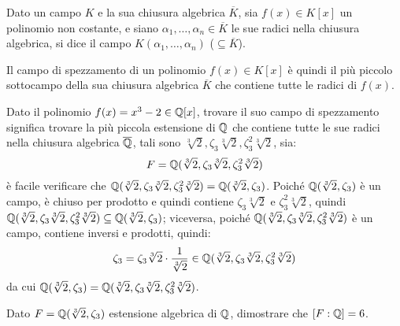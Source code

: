 \documentclass[11pt]{scrartcl}
\begin{document}
\begin{definition}
Dato un campo $K$ e la sua chiusura algebrica $\overline K$, sia $f(x) \in K[x]$ un polinomio non costante, e siano $\alpha_1,\ldots,\alpha_n \in \overline K$ le sue radici nella chiusura algebrica, si dice  il campo $K(\alpha_1,\ldots,\alpha_n)$ ($\subseteq \overline K$). 
\end{definition}

\begin{remark}
Il campo di spezzamento di un polinomio $f(x) \in K[x]$ è quindi il più piccolo sottocampo della sua chiusura algebrica $\overline K$ che contiene tutte le radici di $f(x)$. 
\end{remark}

\begin{example}
Dato il polinomio $f(x) = x^3 - 2 \in \mathbb Q[x]$, trovare il suo campo di spezzamento significa trovare la più piccola estensione di $\mathbb Q$ che contiene tutte le sue radici nella chiusura algebrica $\overline{\mathbb Q}$, tali sono $\sqrt[3]2, \zeta_3\sqrt[3]2, \zeta_3^2\sqrt[3]2$, sia:
	\[ F=\mathbb Q(\sqrt[3]2, \zeta_3\sqrt[3]2, \zeta_3^2\sqrt[3]2)
	\]
è facile verificare che $\mathbb Q(\sqrt[3]2, \zeta_3\sqrt[3]2, \zeta_3^2\sqrt[3]2) = \mathbb Q(\sqrt[3]2, \zeta_3)$. Poiché $\mathbb Q(\sqrt[3]2, \zeta_3)$ è un campo, è chiuso per prodotto e quindi contiene $\zeta_3\sqrt[3]2$ e $\zeta_3^2\sqrt[3]2$, quindi $\mathbb Q(\sqrt[3]2, \zeta_3\sqrt[3]2, \zeta_3^2\sqrt[3]2) \subseteq \mathbb Q(\sqrt[3]2, \zeta_3)$; viceversa, poiché $\mathbb Q(\sqrt[3]2, \zeta_3\sqrt[3]2, \zeta_3^2\sqrt[3]2)$ è un campo, contiene inversi e prodotti, quindi:
	\[ \zeta_3=\zeta_3\sqrt[3]2 \cdot \frac{1}{\sqrt[3]2} \in \mathbb Q(\sqrt[3]2, \zeta_3\sqrt[3]2, \zeta_3^2\sqrt[3]2)
	\]
da cui $\mathbb Q(\sqrt[3]2, \zeta_3) = \mathbb Q(\sqrt[3]2, \zeta_3\sqrt[3]2, \zeta_3^2\sqrt[3]2)$.
\end{example}

\begin{exercise}
Dato $F = \mathbb Q(\sqrt[3]2, \zeta_3)$ estensione algebrica di $\mathbb Q$, dimostrare che $[F:\mathbb Q]=6$.
\end{exercise}
\end{document}
